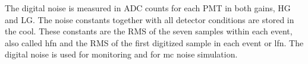 The digital noise is measured in ADC counts for each PMT in both gains, HG and
LG\@. The noise constants together with all detector conditions are stored in
the \gls{cool}. These constants are the RMS of the seven samples within each
event, also called \gls{hfn} and the RMS of the first digitized sample in each
event or \gls{lfn}. The digital noise is used for monitoring and for \gls{mc}
noise simulation.
